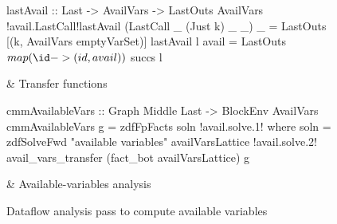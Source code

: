\documentclass[blockstyle,preprint,nocopyrightspace]{sigplanconf}
\newcommand\figlabel[1]{\label{fig:#1}}
\begin{document}
\begin{figure*}
\begin{codetable}
\begin{code}
lastAvail :: Last -> AvailVars -> LastOuts AvailVars
!avail.LastCall!lastAvail (LastCall _ (Just k) _ _) _ = LastOuts [(k, AvailVars emptyVarSet)]
lastAvail l avail = LastOuts $ map (\id -> (id, avail)) $ succs l
\end{code}%
\B
& Transfer \mbox{functions}\\
\hline

\T\begin{code}
cmmAvailableVars :: Graph Middle Last -> BlockEnv AvailVars
cmmAvailableVars g = zdfFpFacts soln
!avail.solve.1!  where soln = zdfSolveFwd "available variables" availVarsLattice 
!avail.solve.2!               avail_vars_transfer (fact_bot availVarsLattice) g
\end{code}%
\B
& Available-variables analysis\\

\end{codetable}
\caption{Dataflow analysis pass to compute available variables}
\figlabel{avail-all}
\figlabel{avail}
\figlabel{avail-lattice}
\figlabel{avail-gen-kill}
\figlabel{avail-transfers}
\figlabel{avail-running}
\end{figure*}

% 
% 
% 
% 
\end{document}
